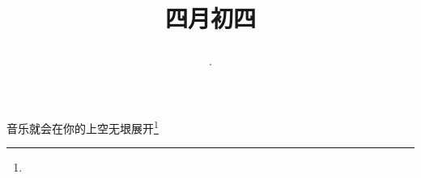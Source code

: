 \title{\date[d=11,m=5,y=2024][year:cn-y,年,month:cn,day:cn,日,·,weekday]·四月初四 }
音乐就会在你的上空无垠展开\footnote{ }


